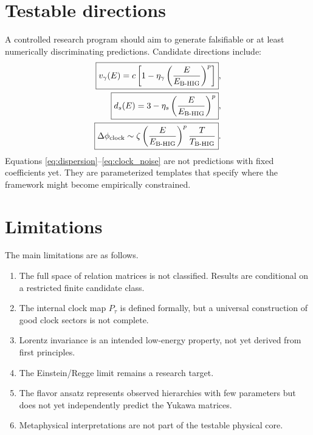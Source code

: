 \documentclass[11pt,a4paper]{article}
\begin{document}
\section{Testable directions}
A controlled research program should aim to generate falsifiable or at least numerically discriminating predictions. Candidate directions include:
\begin{align}
\boxed{v_\gamma(E)=c\left[1-\eta_\gamma\left(\frac{E}{E_{\rm B\text{-}HIG}}\right)^p\right]} ,\label{eq:dispersion}\\
\boxed{d_s(E)=3-\eta_s\left(\frac{E}{E_{\rm B\text{-}HIG}}\right)^p} ,\label{eq:ds_flow}\\
\boxed{\Delta\phi_{\rm clock}\sim \zeta\left(\frac{E}{E_{\rm B\text{-}HIG}}\right)^p\frac{T}{T_{\rm B\text{-}HIG}}} .\label{eq:clock_noise}
\end{align}
Equations \eqref{eq:dispersion}--\eqref{eq:clock_noise} are not predictions with fixed coefficients yet. They are parameterized templates that specify where the framework might become empirically constrained.

\section{Limitations}
The main limitations are as follows.
\begin{enumerate}[label=(\roman*)]
\item The full space of relation matrices is not classified. Results are conditional on a restricted finite candidate class.
\item The internal clock map $P_\tau$ is defined formally, but a universal construction of good clock sectors is not complete.
\item Lorentz invariance is an intended low-energy property, not yet derived from first principles.
\item The Einstein/Regge limit remains a research target.
\item The flavor ansatz represents observed hierarchies with few parameters but does not yet independently predict the Yukawa matrices.
\item Metaphysical interpretations are not part of the testable physical core.
\end{enumerate}
\end{document}
